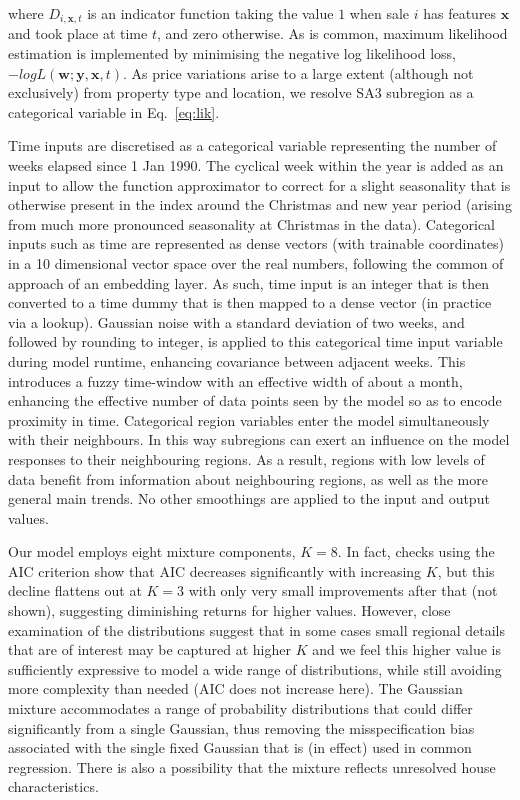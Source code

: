 where $D_{i, \mathbf{x}, t}$ is an indicator function taking the value $1$ when sale $i$ has features $\mathbf{x}$ and took place at time $t$, and zero otherwise. As is common, maximum likelihood estimation is implemented by minimising the negative log likelihood loss, $-log L(\mathbf{w};\mathbf{y},\mathbf{x}, t)$. 
As price variations arise to a large extent (although not exclusively) from property type and location, we resolve SA3 subregion as a categorical variable in Eq.~\ref{eq:lik}. 


 Time inputs are discretised as a categorical variable representing the number of weeks elapsed since 1 Jan 1990. The cyclical week within the year is added as an input to allow the function approximator to correct for a slight seasonality that is otherwise present in the index around the Christmas and new year period (arising from much more pronounced seasonality at Christmas in the data). Categorical inputs such as time are represented as dense vectors (with trainable coordinates) in a 10 dimensional vector space over the real numbers, following the common of approach of an embedding layer. As such, time input is an integer that is then converted to a time dummy that is then mapped to a dense vector (in practice via a lookup).  Gaussian noise with a standard deviation of two weeks, and followed by rounding to integer, is applied to this categorical time input variable during model runtime, enhancing covariance between adjacent weeks. This introduces a fuzzy time-window with an effective width of about a month, enhancing the effective number of data points seen by the model so as to encode proximity in time. Categorical region variables enter the model simultaneously with their neighbours. In this way subregions can exert an influence on the model responses to their neighbouring regions. As a result, regions with low levels of data benefit from information about neighbouring regions, as well as the more general main trends. No other smoothings are applied to the input and output values. 

Our model employs eight mixture components, $K=8$. In fact, checks using the AIC criterion show that AIC decreases significantly with increasing $K$, but this decline flattens out at $K=3$  with only very small improvements after that (not shown), suggesting diminishing returns for higher values.
 However, close examination of the distributions suggest that in some cases small regional details that are of interest may be captured at higher $K$ and we feel this higher value is sufficiently expressive to model a wide range of distributions, while still avoiding more complexity than needed (AIC does not increase here). The Gaussian mixture accommodates a range of probability distributions that could differ significantly from a single Gaussian, thus removing the misspecification bias associated with the single fixed Gaussian that is (in effect) used in common regression. There is also a possibility that the mixture reflects unresolved house characteristics.

